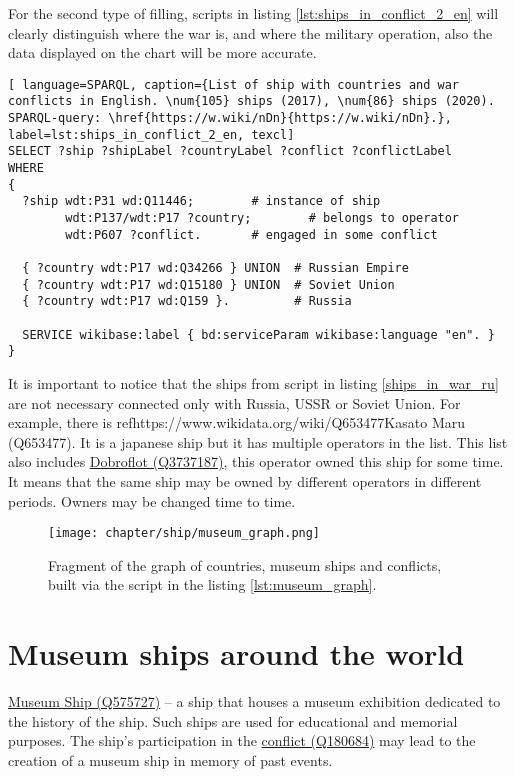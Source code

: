 \label{question:ship_3}

For the second type of filling, scripts in listing \ref{lst:ships_in_conflict_2_en} will clearly distinguish where the war is, and where the military operation, also the data displayed on the chart will be more accurate.

\begin{lstlisting}[ language=SPARQL, caption={List of ship with countries and war conflicts in English. \num{105} ships (2017), \num{86} ships (2020). SPARQL-query: \href{https://w.wiki/nDn}{https://w.wiki/nDn}.}, label=lst:ships_in_conflict_2_en, texcl]
SELECT ?ship ?shipLabel ?countryLabel ?conflict ?conflictLabel
WHERE
{
  ?ship wdt:P31 wd:Q11446;        # instance of ship
        wdt:P137/wdt:P17 ?country;        # belongs to operator
        wdt:P607 ?conflict.       # engaged in some conflict
      
  { ?country wdt:P17 wd:Q34266 } UNION  # Russian Empire
  { ?country wdt:P17 wd:Q15180 } UNION  # Soviet Union
  { ?country wdt:P17 wd:Q159 }.         # Russia
      
  SERVICE wikibase:label { bd:serviceParam wikibase:language "en". }
}
\end{lstlisting}

It is important to notice that the ships from script in listing \ref{ships_in_war_ru} are not necessary connected only with Russia, USSR or Soviet Union.
For example, there is ref{https://www.wikidata.org/wiki/Q653477}{Kasato Maru (Q653477)}. It is a japanese ship but it has multiple operators in the list. This list also includes \href{https://www.wikidata.org/wiki/Q3737187}{Dobroflot (Q3737187)}, this operator owned this ship for some time. It means that the same ship may be owned by different operators in different periods. Owners may be changed time to time.

\begin{figure*}[ht]
  \texttt{[image: chapter/ship/museum\_graph.png]}
  \caption[Graph of countries and museum ships]{Fragment of the graph of countries, museum ships and conflicts, built via the script in the listing \ref{lst:museum_graph}.}%
  \label{fig:museum_graph}%
\end{figure*}
\section{Museum ships around the world}
\href{https://www.wikidata.org/wiki/Q575727}{Museum Ship (Q575727)} -- a ship that houses a museum exhibition dedicated to the history of the ship. Such ships are used for educational and memorial purposes. The ship's participation in the \href{https://www.wikidata.org/wiki/Q180684}{conflict (Q180684)} may lead to the creation of a museum ship in memory of past events.

